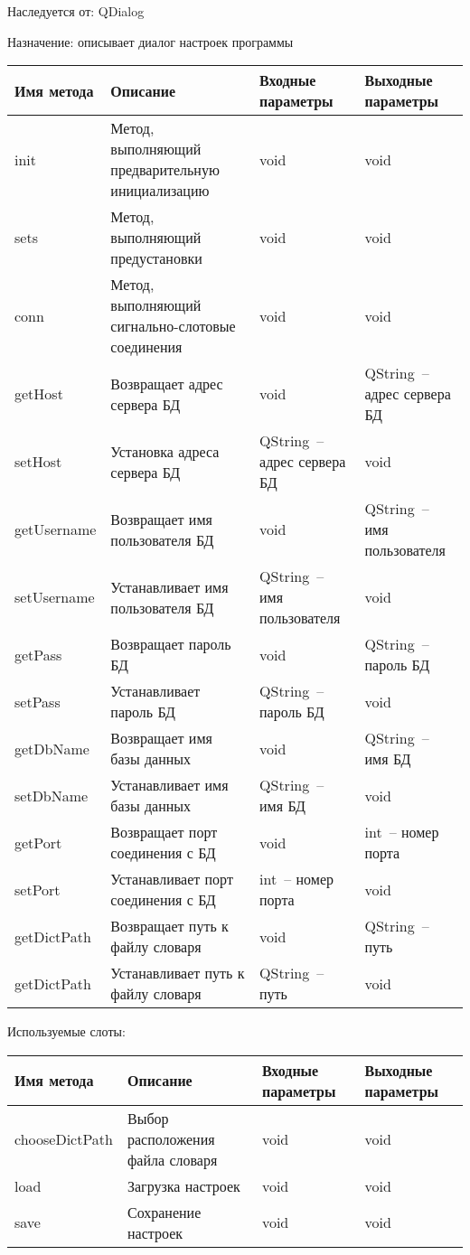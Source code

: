\documentclass[a4paper,14pt,russian]{extreport}
\begin{document}
Наследуется от: QDialog

Назначение: описывает диалог настроек программы

\begin{longtable}{|m{3 cm}|m{3 cm}|m{4 cm}|m{4 cm}|}
\hline
Имя метода & Описание & Входные параметры & Выходные параметры \\
\hline
init & Метод, выполняющий предварительную инициализацию & void & void \\
\hline
sets & Метод, выполняющий предустановки & void & void \\
\hline
conn & Метод, выполняющий сигнально-слотовые соединения & void & void \\
\hline
getHost & Возвращает адрес сервера БД & void & QString~-- адрес сервера БД \\
\hline
setHost & Установка адреса сервера БД & QString~-- адрес сервера БД & void \\
\hline
{get\-Username} & Возвращает имя пользователя БД & void & QString~-- имя пользователя \\
\hline
{set\-Username} & Устанавливает имя пользователя БД & QString~-- имя пользователя & void \\
\hline
getPass & Возвращает пароль БД & void & QString~-- пароль БД \\
\hline
setPass & Устанавливает пароль БД & QString~-- пароль БД & void \\
\hline
{getDb\-Name} & Возвращает имя базы данных & void & QString~-- имя БД \\
\hline
{setDb\-Name} & Устанавливает имя базы данных & QString~-- имя БД & void \\
\hline
getPort & Возвращает порт соединения с БД & void & int~-- номер порта \\
\hline
setPort & Устанавливает порт соединения с БД & int~-- номер порта & void \\
\hline
{get\-Dict\-Path} & Возвращает путь к файлу словаря & void & QString~-- путь \\
\hline
{get\-Dict\-Path} & Устанавливает путь к файлу словаря & QString~-- путь & void \\
\hline
\end{longtable}

\newpage

Используемые слоты:
\begin{longtable}{|m{3 cm}|m{3 cm}|m{4 cm}|m{4 cm}|}
\hline
Имя метода & Описание & Входные параметры & Выходные параметры \\
\hline
{choose\-Dict\-Path} & Выбор расположения файла словаря & void & void \\
\hline
load & Загрузка настроек & void & void \\
\hline
save & Сохранение настроек & void & void \\
\hline
\end{longtable}
\end{document}

